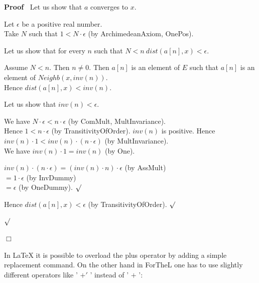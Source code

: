 \documentclass{article}
\newenvironment{forthel}{\begin{leftbar}}{\end{leftbar}}
\newenvironment{proof}{\noindent\textbf{Proof\ }}{\hspace*{\fill}$\Box$\medskip}
\newenvironment{subproof}{\begin{list}{}{}
		\item[\text{Proof}]}{\hfill $\surd$ \end{list}}
\newcommand{\dotequal}{=}
\begin{document}
\begin{forthel}
\begin{proof}
		\noindent Let us show that $a$ converges to $x$.
		\begin{subproof}
			Let $\epsilon$ be a positive real number.\\
			Take $N$ such that $1 < N \cdot \epsilon$ (by ArchimedeanAxiom, OnePos).
			
			\noindent Let us show that for every $n$ such that $N < n \ dist(a[n],x) < \epsilon$.
			\begin{subproof}
				Assume $N < n$. Then $n \neq 0$.
				Then $a[n]$ is an element of $E$ such that $a[n]$ is an element of $Neighb(x,inv(n))$.\\
				Hence $dist(a[n],x) < inv(n)$.
				
				\noindent Let us show that $inv(n) < \epsilon$.
				\begin{subproof}
					We have $N \cdot \epsilon < n \cdot \epsilon$ (by ComMult, MultInvariance).\\
					Hence $1 < n \cdot \epsilon$ (by 	TransitivityOfOrder).
					$inv(n)$ is positive.
					Hence $inv(n) \cdot 1 < inv(n) \cdot (n \cdot \epsilon)$ (by MultInvariance).\\
					We have $inv(n) \cdot 1 = inv(n)$ (by One).
					
					$inv(n) \cdot (n \cdot \epsilon) \dotequal 		(inv(n) \cdot n) \cdot \epsilon$ (by AssMult)\\
					$\dotequal 1 \cdot \epsilon$ (by InvDummy)\\
					$\dotequal \epsilon$ (by OneDummy).
				\end{subproof}
				Hence $dist(a[n],x) < \epsilon$ (by 		TransitivityOfOrder).
			\end{subproof}
		\end{subproof}
	\end{proof}
\end{forthel}

\noindent In LaTeX it is possible to overload the plus operator by adding a simple replacement command. On the other hand in ForTheL one has to use slightly different operators like ' $+'$ ' instead of ' $+$ ':
\end{document}
